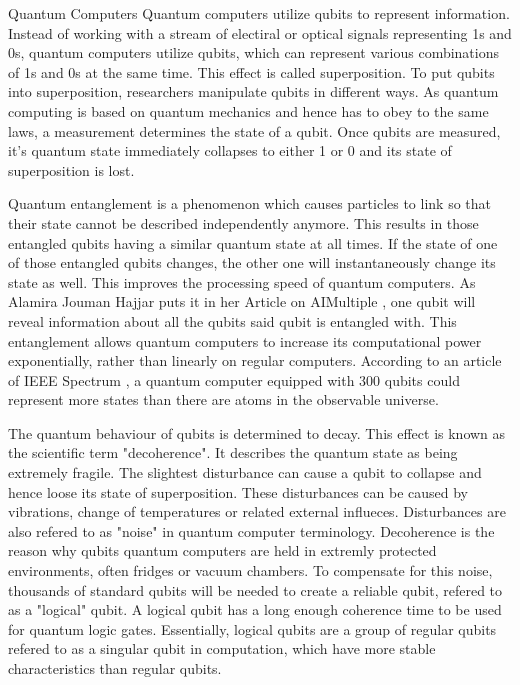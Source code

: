 \documentclass[aps,preprintnumbers,twocolumn]{revtex4}
\begin{document}
\begin{section}{Quantum Computers}
Quantum computers utilize qubits to represent information. 
Instead of working with a stream of electiral or optical signals representing 1s and 0s, 
quantum computers utilize qubits, which can represent various combinations of 1s and 0s at the same time. 
This effect is called superposition. To put qubits into superposition, 
researchers manipulate qubits in different ways. As quantum computing is based on quantum mechanics and hence has to obey to the same laws, 
a measurement determines the state of a qubit. Once qubits are measured, 
it's quantum state immediately collapses to either 1 or 0 and its state of superposition is lost.

Quantum entanglement is a phenomenon which causes particles to link so that their state cannot be described independently anymore.
This results in those entangled qubits having a similar quantum state at all times.
If the state of one of those entangled qubits changes,
the other one will instantaneously change its state as well. This improves the processing speed of quantum computers. As Alamira Jouman Hajjar puts it in her Article on AIMultiple \cite{AIMultiple}, one qubit will reveal information about all the qubits said qubit is entangled with.
This entanglement allows quantum computers to increase its computational power exponentially,
rather than linearly on regular computers.
According to an article of IEEE Spectrum \cite{IEEE}, a quantum computer equipped with 300 qubits could represent more states than there are atoms in the observable universe.

The quantum behaviour of qubits is determined to decay.
This effect is known as the scientific term "decoherence".
It describes the quantum state as being extremely fragile.
The slightest disturbance can cause a qubit to collapse and hence loose its state of superposition.
These disturbances can be caused by vibrations, change of temperatures or related external influeces.
Disturbances are also refered to as "noise" in quantum computer terminology.
Decoherence is the reason why qubits quantum computers are held in extremly protected environments, 
often fridges or vacuum chambers.
To compensate for this noise, 
thousands of standard qubits will be needed to create a reliable qubit, 
refered to as a "logical" qubit. 
A logical qubit has a long enough coherence time to be used for quantum logic gates. 
Essentially, logical qubits are a group of regular qubits refered to as a singular qubit in computation, 
which have more stable characteristics than regular qubits.


\end{section}
\end{document}
